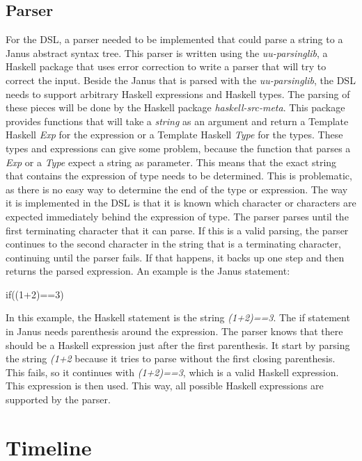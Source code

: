 \documentclass[12pt,a4paper]{article}
\begin{document}
\subsection{Parser}
For the DSL, a parser needed to be implemented that could parse a string to a Janus abstract syntax tree. This parser is written using the \textit{uu-parsinglib}, a Haskell package that uses error correction to write a parser that will try to correct the input. Beside the Janus that is parsed with the \textit{uu-parsinglib}, the DSL needs to support arbitrary Haskell expressions and Haskell types. The parsing of these pieces will be done by the Haskell package \textit{haskell-src-meta}. This package provides functions that will take a \textit{string} as an argument and return a Template Haskell \textit{Exp} for the expression or a Template Haskell \textit{Type} for the types. These types and expressions can give some problem, because the function that parses a \textit{Exp} or a \textit{Type} expect a string as parameter. This means that the exact string that contains the expression of type needs to be determined. This is problematic, as there is no easy way to determine the end of the type or expression. The way it is implemented in the DSL is that it is known which character or characters are expected immediately behind the expression of type. The parser parses until the first terminating character that it can parse. If this is a valid parsing, the parser continues to the second character in the string that is a terminating character, continuing until the parser fails. If that happens, it backs up one step and then returns the parsed expression. An example is the Janus statement:
	\begin{displayquote}
		if((1+2)==3)
	\end{displayquote}
In this example, the Haskell statement is the string \textit{(1+2)==3}. The if statement in Janus needs parenthesis around the expression. The parser knows that there should be a Haskell expression just after the first parenthesis. It start by parsing the string \textit{(1+2} because it tries to parse without the first closing parenthesis. This fails, so it continues with \textit{(1+2)==3}, which is a valid Haskell expression. This expression is then used. This way, all possible Haskell expressions are supported by the parser.

\section{Timeline}
\end{document}
